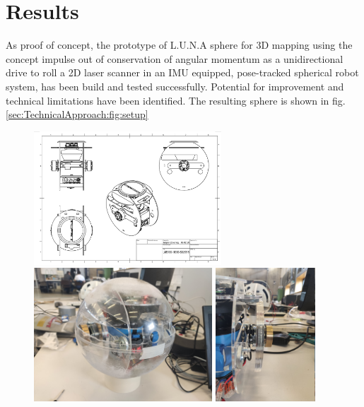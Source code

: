 \section*{Results}
\label{sec:Results}

As proof of concept, the prototype of L.U.N.A sphere for 3D mapping using the concept impulse out of conservation of angular momentum as a unidirectional drive to roll a 2D laser scanner in an IMU equipped, pose-tracked spherical robot system, has been build and tested successfully. Potential for improvement and technical limitations have been identified.
The resulting sphere is shown in fig. \ref{sec:TechnicalApproach:fig:setup}
\begin{figure}
\centering                                                                                                                                                                                                        
\includegraphics[height=50mm]{../Media/BlueprintPNG.png}                                                                                                                                                      \\
\vspace{0.5cm}
\includegraphics[height=50mm]{../Media/sphereFullshellLeft.jpg}
\includegraphics[height=50mm]{../Media/sphereRightMotor.jpg}   

\end{figure}
